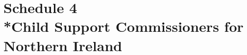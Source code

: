\documentclass[12pt,a4paper]{article}
\begin{document}
%
%
%
%
%
%
%
%
%
%
%
%

\part[Schedule 4 --- Child Support Commissioners
for Northern Ireland  %
]{Schedule 4\\*Child Support Commissioners
for Northern Ireland  %
}
\end{document}
